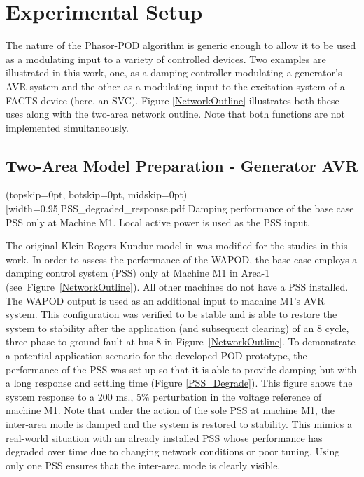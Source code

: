 \documentclass{ieeeaccess}
\begin{document}
\section{Experimental Setup}\label{SetupPreparation}

The nature of the Phasor-POD algorithm is generic enough to allow it to be used as a modulating input to a variety of controlled devices. Two examples are illustrated in this work, one, as a damping controller modulating a generator\rq{s} AVR system and the other as a modulating input to the excitation system of a FACTS device (here, an SVC). Figure \ref{NetworkOutline} illustrates both these uses along with the two-area network outline. Note that both functions are not implemented simultaneously.

\subsection{Two-Area Model Preparation - Generator AVR}

\Figure[tbp](topskip=0pt, botskip=0pt, midskip=0pt)[width=0.95\columnwidth]{PSS_degraded_response.pdf}
{Damping performance of the base case PSS only at Machine M1. Local active power is used as the PSS input.\label{PSS_Degrade}}

The original Klein-Rogers-Kundur model in \cite{KundurTwoArea} was modified for the studies in this work. In order to assess the performance of the WAPOD, the base case employs a damping control system (PSS) only at Machine M1 in Area-1 (see~Figure~\ref{NetworkOutline}). All other machines do not have a PSS installed. The WAPOD output is used as an additional input to machine M1\rq{s} AVR system. This configuration was  verified to be stable and is able to restore the system to stability after the application (and subsequent clearing) of an 8 cycle, three-phase to ground fault at bus 8 in Figure~\ref{NetworkOutline}. To demonstrate a potential application scenario for the developed POD prototype, the performance of the PSS was set up so that it is able to provide damping but with a long response and settling time (Figure \ref{PSS_Degrade}). This figure shows the system response to a 200 ms., 5\% perturbation in the voltage reference of machine M1. Note that under the action of the sole PSS at machine M1, the inter-area mode is damped and the system is restored to stability. This mimics a real-world situation with an already installed PSS whose performance has degraded over time due to changing network conditions or poor tuning. Using only one PSS ensures that the inter-area mode is clearly visible. 
\end{document}
